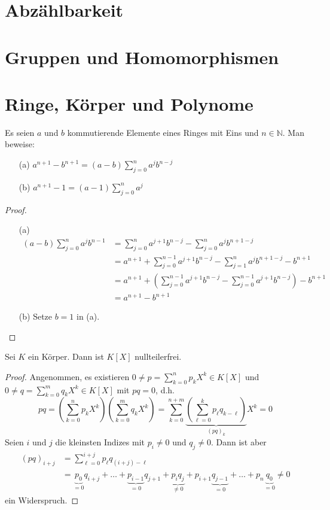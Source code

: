 \section{Abzählbarkeit}
\section{Gruppen und Homomorphismen}
\section{Ringe, Körper und Polynome}
\begin{aufgabe}
	Es seien $a$ und $b$ kommutierende Elemente eines Ringes mit Eins und $n \in \mathbb N$.
	Man beweise:
	\begin{enumerate}
		\item[(a)] $\displaystyle a^{n+1} - b^{n+1} = (a-b) \sum_{j=0}^n a^j b^{n-j} $
		\item[(b)] $\displaystyle a^{n+1} - 1 = (a-1) \sum_{j=0}^n a^j$ 
	\end{enumerate}
\end{aufgabe}
\begin{proof}
	\begin{enumerate}
		\item[(a)]
			\begin{align*}
				(a-b) \sum_{j=0}^n a^j b^{n-1}
				&= \sum_{j=0}^n a^{j+1} b^{n-j} - \sum_{j=0}^n a^j b^{n+1-j} \\
				&= a^{n+1} + \sum_{j=0}^{n-1} a^{j+1} b^{n-j} - \sum_{j=1}^n a^j b^{n+1-j} - b^{n+1} \\
				&= a^{n+1} + \left( \sum_{j=0}^{n-1} a^{j+1} b^{n-j} - \sum_{j=0}^{n-1} a^{j+1} b^{n-j}
					\right) - b^{n+1} \\
				&= a^{n+1} - b^{n+1}
			\end{align*}
		\item[(b)]
			Setze $b=1$ in (a).
	\end{enumerate}
\end{proof}

\setcounter{aufgabe}{2}
\begin{aufgabe} Sei $K$ ein Körper. Dann ist $K[X]$ nullteilerfrei. \end{aufgabe}
\begin{proof}
	Angenommen, es existieren $0 \neq p = \sum_{k=0}^n p_k X^k \in K[X]$ und
	$0 \neq q = \sum_{k=0}^m q_k X^k \in K[X]$ mit $p q = 0$, d.h.
	\[
		p q = \left( \sum_{k=0}^n p_k X^k \right) \left( \sum_{k=0}^m q_k X^k \right)
		= \sum_{k=0}^{n+m} \underbrace{ \left( \sum_{\ell = 0}^k p_\ell q_{k-\ell} \right)}_{(pq)_k} X^k
			= 0
	\]
	Seien $i$ und $j$ die kleinsten Indizes mit $p_i \neq 0$ und $q_j \neq 0$. Dann ist aber
	\begin{align*}
		(pq)_{i+j} &= \sum_{\ell = 0}^{i+j} p_{\ell} q_{(i+j)-\ell} \\
		&= \underbrace{ p_0 }_{=0} q_{i+j} + \ldots
		+ \underbrace{p_{i-1}}_{=0} q_{j+1} 
		+ \underbrace{p_i q_j}_{\neq 0}
		+ p_{i+1} \underbrace{q_{j-1}}_{=0} + \ldots
		+ p_n \underbrace{ q_{0} }_{=0} \neq 0
	\end{align*}
	ein Widerspruch.
\end{proof}

